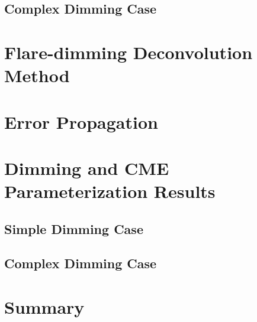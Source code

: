 \subsection{Complex Dimming Case}

\section{Flare-dimming Deconvolution Method}
\label{sec:deconvolve}

\section{Error Propagation}
\label{sec:deconvolveerrors}

\section{Dimming and CME Parameterization Results}
\label{sec:casestudyresults}

\subsection{Simple Dimming Case}

\subsection{Complex Dimming Case}

\section{Summary}
